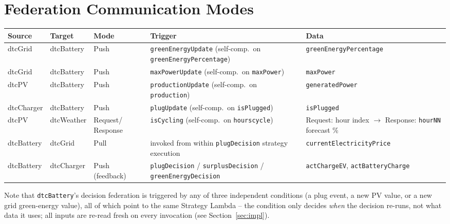 \documentclass[11pt]{article}
\renewcommand{\_}{\textunderscore\allowbreak}
\begin{document}
\section{Federation Communication Modes}
\label{sec:modes}

\begin{center}
\footnotesize
\setlength{\tabcolsep}{3pt}
\renewcommand{\arraystretch}{1.3}
\begin{tabularx}{\textwidth}{
  @{}>{\raggedright\arraybackslash}p{1.55cm}
  >{\raggedright\arraybackslash}p{1.55cm}
  >{\raggedright\arraybackslash}p{1.7cm}
  >{\raggedright\arraybackslash}X
  >{\raggedright\arraybackslash}X@{}
}
\toprule
\textbf{Source} & \textbf{Target} & \textbf{Mode} & \textbf{Trigger} & \textbf{Data} \\
\midrule
dtcGrid & dtcBattery & Push & \texttt{greenEnergyUpdate} (self-comp.\ on \texttt{greenEnergyPercentage}) & \texttt{greenEnergyPercentage} \\
dtcGrid & dtcBattery & Push & \texttt{maxPowerUpdate} (self-comp.\ on \texttt{maxPower}) & \texttt{maxPower} \\
dtcPV & dtcBattery & Push & \texttt{productionUpdate} (self-comp.\ on \texttt{production}) & \texttt{generatedPower} \\
dtcCharger & dtcBattery & Push & \texttt{plugUpdate} (self-comp.\ on \texttt{isPlugged}) & \texttt{isPlugged} \\
dtcPV & dtcWeather & Request/ Response & \texttt{isCycling} (self-comp.\ on \texttt{hours\_cycle}) & Request: hour index $\rightarrow$ Response: \texttt{hourNN} forecast \% \\
dtcBattery & dtcGrid & Pull & invoked from within \texttt{plugDecision} strategy execution & \texttt{currentElectricityPrice} \\
dtcBattery & dtcCharger & Push (feedback) & \texttt{plugDecision} / \texttt{surplusDecision} / \texttt{greenEnergyDecision} & \texttt{actChargeEV}, \texttt{actBatteryCharge} \\
\bottomrule
\end{tabularx}
\end{center}

Note that \texttt{dtcBattery}'s decision federation is triggered by any of
three independent conditions (a plug event, a new PV value, or a new grid
green-energy value), all of which point to the same Strategy Lambda -- the
condition only decides \emph{when} the decision re-runs, not what data it
uses; all inputs are re-read fresh on every invocation (see
Section~\ref{sec:impl}).
\end{document}
